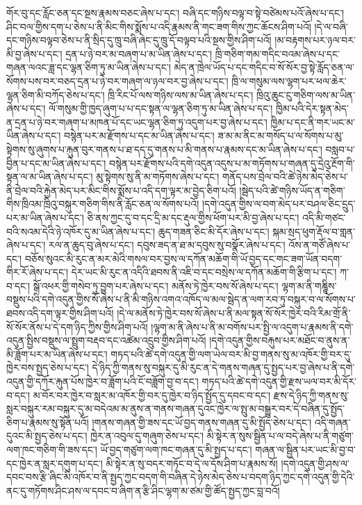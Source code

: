 གོར་བུ་དང་རློང་ཅན་དང་སྔས་རྣམས་བཅང་ཞེས་པ་དང་། བཞི་དང་གཉིས་བལྟ་བ་སྟེ་བཙེམས་པའོ་ཞེས་པ་དང་། ཤིང་བལ་གྱིས་དག་པ་ཅེས་པ་ནི་མིང་གིས་སྨོས་པ་འདི་རྣམས་ནི་གང་ཟག་གིས་ཀྱང་ཆོངས་ཤིག་པའོ། །དེ་ལ་བཞི་དང་གཉིས་བལྟབ་ཅེས་པ་ནི་སྲིད་དུ་ཁྲུ་བཞི་ཞེང་དུ་ཁྲུ་དོ་བལྟབ་པའི་སྔས་གྱིས་ཤིག་པའོ། །མ་བརྟགས་པར་ཉལ་བར་མི་བྱ་ཞེས་པ་དང་། དྲན་པ་ཉེ་བར་མ་བཞག་པ་མ་ཡིན་ཞེས་པ་དང་། ཁྲི་གཅིག་གམ་གདིང་བའམ་ཞེས་པ་དང་གཞན་ལའང་ཟླ་དང་ལྷན་ཅིག་ཏུ་མ་ཡིན་ཞེས་པ་དང་། མེད་ན་ཁྲེལ་ཡོད་པ་དང་གདིང་བ་སོ་སོར་བྱ་སྟེ་རློད་ཅན་ལ་སོགས་པས་བར་བཅད་དྲན་པ་ཉེ་བར་གཞག་ལ་ཉལ་བར་བྱ་ཞེས་པ་དང་། ཁྲི་ལ་གསུམ་ལས་ལྷག་པར་ཕལ་ཆེར་ལྷན་ཅིག་མི་བཀོད་ཅེས་པ་དང་། ཁྲི་རིང་པོ་ལས་གཉིས་ལས་མ་ཡིན་ཞེས་པ་དང་། ཁྲིའུ་ཆུང་ངུ་གཅིག་ལས་མ་ཡིན་ཞེས་པ་དང་། ལོ་གསུམ་གྱི་ཁྱད་ཞུག་པ་པ་དང་སྟན་ལ་ལྷན་ཅིག་ཏུ་མ་ཡིན་ཞེས་པ་དང་། ཁྱིམ་པའི་དེར་སྟན་མེད་ན་དྲན་པ་ཉེ་བར་གཞག་པ་མཁན་པོ་དང་ཡང་ལྷན་ཅིག་ཏུ་འདུག་པར་བྱ་ཞེས་པ་དང་། ཁྱིམ་པ་དང་ནི་གར་ཡང་མ་ཡིན་ཞེས་པ་དང་། བསྙེན་པར་མ་རྫོགས་པ་དང་མ་ཡིན་ཞེས་པ་དང་། ཟ་མ་མ་ནིང་མ་གསོད་པ་ལ་སོགས་པ་མུ་སྟེགས་སུ་ཞུགས་པ་རྐུན་བུར་གནས་པ་ཐ་དད་དུ་གནས་པ་མི་གནས་པ་རྣམས་དང་མ་ཡིན་ཞེས་པ་དང་། བསླབ་པ་བྱིན་པ་དང་མ་ཡིན་ཞེས་པ་དང་། བསྙེན་པར་རྫོགས་པའི་དགེ་འདུན་འདུས་པ་མ་གཏོགས་པ་གཞན་དུ་དྲེའུ་རྔོག་གི་སྟན་ལ་མ་ཡིན་ཞེས་པ་དང་། མུ་སྟེགས་སུ་ནི་མ་གཏོགས་ཞེས་པ་དང་། གནོད་པས་བྲེལ་བའི་ཚེ་ཉེས་མེད་ཅེས་པ་ནི་བྲེལ་བའི་རྐྱེན་མེད་པར་མིང་གིས་སྨོས་པ་འདི་དག་ལྟར་མ་བྱེད་ཅིག་པའོ། །སྦེད་པའི་ཚེ་གཉིས་ཡོད་ན་གཅིག་གིས་ཁྲིའམ་ཁྲིའུ་བསྐུར་གཅིག་གིས་ནི་རློང་ཅན་ལ་སོགས་པའོ། །དགེ་འདུན་གྱིས་ལ་བག་མེད་པར་བཤལ་ཅིང་དྲུད་པར་མ་ཡིན་ཞེས་པ་དང་། ཅི་ནས་ཀྱང་དུ་བ་དང་དྲི་མ་དང་རྡུལ་གྱིས་ཕོག་པར་མི་བྱ་ཞེས་པ་དང་། འདི་མི་གཙང་བའི་སའམ་དེའི་ཉེ་འཁོར་དུ་མ་ཡིན་ཞེས་པ་དང་། ཆུད་གཟན་ཅིང་མི་དོར་ཞེས་པ་དང་། སྐམ་སྲད་ཕུག་རྡོལ་བ་གླན་ཞེས་པ་དང་། རལ་ན་ཆུད་བུ་ཞེས་པ་དང་། དབུས་ཟད་ན་ཐ་མ་དབུས་སུ་བསྣོར་ཞེས་པ་དང་། འོས་ན་གཙོ་ཞེས་པ་དང་། བཅོས་སུའང་མི་རུང་ན་མར་མེའི་གསལ་བར་བྱས་ལ་དཀོན་མཆོག་གི་ཡོ་བྱད་དང་གང་ཟག་ཡོན་བདག་གིར་རོ་ཞེས་པ་དང་། དེར་ཡང་མི་རུང་ན་འདིའི་ཐབས་ནི་འཇི་བ་དང་བསྲེས་ལ་དཀོན་མཆོག་གི་རྩིག་པ་དང་། ཀ་བ་དང་། སྒོ་འཕར་གྱི་གསེབ་ཏུ་བྱུག་པར་ཞེས་པ་དང་། མནོས་ཏེ་ཁྱེར་བས་སོ་ཞེས་པ་དང་། ལྷག་མ་ནི་གཎྜཱིས་བསྡུས་པའི་དགེ་འདུན་གྱིས་སོ་ཞེས་པ་ནི་མི་གཉིས་འགའ་འཁོད་ལ་མལ་སྦེད་ན་ལག་རབ་ཏུ་བསྐུར་བ་ལ་སོགས་པ་ཐབས་འདི་དག་ལྟར་གྱིས་ཤིག་པའོ། །དེ་ལ་མནོས་ཏེ་ཁྱེར་བས་སོ་ཞེས་པ་ནི་མལ་སྟན་སོ་སོར་ཁྱེར་བའི་རིམ་གྲོ་ནི་སོ་སོར་ནོས་པ་དེ་དག་ཉིད་ཀྱིས་གྱིས་ཤིག་པའོ། །ལྷག་མ་ནི་ཞེས་པ་ནི་མ་བགོས་པར་སྤྱི་ལ་འདུག་པ་རྣམས་ནི་དགེ་འདུན་སྤྱིས་བསྡུས་ལ་སྤྲུག་བརྡབ་དང་འཚེམ་འདྲུབ་གྱིས་ཤིག་པའོ། །དགེ་འདུན་གྱིས་བརྐུས་པར་མཐོང་བ་ནུས་ན་མི་ཟློག་པར་མ་ཡིན་ཞེས་པ་དང་། གཏད་པའི་ཚེ་དགེ་འདུན་གྱི་ལག་ཡེལ་བར་མི་བྱ་གནས་སུ་མ་འཁོར་གྱི་བར་དུ་ཁྱེར་བས་སྤྱད་ཅེས་པ་དང་། དེ་ཉིད་ཀྱི་གནས་སུ་བསྐུར་དུ་མི་རུང་ན་དེ་གནས་གཞན་དུ་སྤྱད་པར་བྱ་ཞེས་པ་ནི་དགེ་འདུན་གྱི་དཀོར་རྐུན་པོས་ཁྱེར་བ་ཟློག་པའི་ངོ་བཟློག་བྱ་བ་དང་། གཏད་པའི་ཚེ་དགེ་འདུན་གྱི་རྫས་ཡལ་བར་མི་དོར་བ་དང་། མ་བོར་བར་ཁྱེར་བ་སླར་མ་འཁོར་གྱི་བར་དུ་ཁྱེར་བ་ཉིད་སྤྱོད་དུ་དབང་བ་དང་། རྫས་དེ་ཉིད་ཀྱི་གནས་སུ་སླར་བསྐུར་རམ་བསྐུར་དུ་མ་བདེའམ་མ་ནུས་ན་གནས་གཞན་དུའང་ཁྱེར་ལ་སྤུ་མ་བསྒྱུར་བར་དེ་བཞིན་དུ་སྤྱོད་ཅིག་པ་རྣམས་སུ་སྟོན་པའོ། །གནས་གཞན་གྱི་ཟས་དང་ཡོ་བྱད་གནས་གཞན་དུ་མི་སྤྱོད་ཅེས་པ་དང་། འདི་གཞན་དུའང་མི་སྤྱད་ཅེས་པ་དང་། ཁྱེར་ན་འབུལ་དུ་གཞུག་ཅེས་པ་དང་། མི་སྟེར་ན་སུས་སྦྱིན་པ་ལ་བདེ་ཞེས་པ་ནི་གཙུག་ལག་ཁང་གཅིག་གི་ཟས་དང་། ཡོ་བྱད་གཙུག་ལག་ཁང་གཞན་དུ་མི་སྤྱད་པ་དང་། གཞན་ལ་སྦྱིན་པར་ཡང་མི་བྱ་བ་དང་ཁྱེར་ན་སླར་དགུག་པ་དང་། མི་སྟེར་ན་སུ་བདར་གཏོང་བ་དེ་ལ་དོས་ཤིག་པ་རྣམས་སོ། །དགེ་འདུན་གྱི་ཤས་ལ་དབང་བས་རྩི་ཞིང་མི་འཁོར་བ་ནི་སྤྱད་ཀྱང་བདག་གི་བཞིན་དེ་ཉེས་མེད་ཅེས་པ་བདག་ཉིད་ཀྱང་དགེ་འདུན་གྱི་དེའི་ནང་དུ་གཏོགས་ཤིང་ཤས་ལ་དབང་བ་ཞིག་ན་རྩི་ཤིང་ལྷག་མ་ཙམ་གྱི་ཚོད་སྤྱད་ཀྱང་བླ་བའོ། 